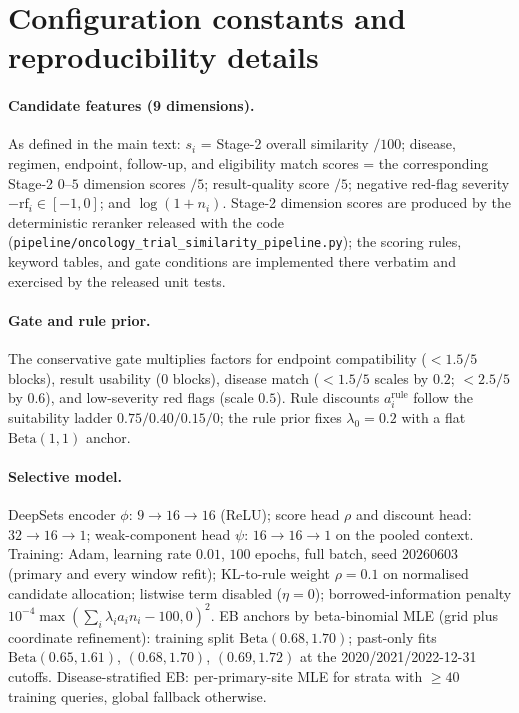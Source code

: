\documentclass[11pt]{article}
\begin{document}
\section{Configuration constants and reproducibility details}

\paragraph{Candidate features (9 dimensions).} As defined in the main text:
$s_i$ = Stage-2 overall similarity $/100$; disease, regimen, endpoint,
follow-up, and eligibility match scores = the corresponding Stage-2 $0$--$5$
dimension scores $/5$; result-quality score $/5$; negative red-flag severity
$-\mathrm{rf}_i \in [-1,0]$; and $\log(1+n_i)$. Stage-2 dimension scores are
produced by the deterministic reranker released with the code
(\texttt{pipeline/\allowbreak oncology\_trial\_similarity\_pipeline.py}); the scoring
rules, keyword tables, and gate conditions are implemented there verbatim and
exercised by the released unit tests.

\paragraph{Gate and rule prior.} The conservative gate multiplies factors for
endpoint compatibility ($<1.5/5$ blocks), result usability ($0$ blocks),
disease match ($<1.5/5$ scales by $0.2$; $<2.5/5$ by $0.6$), and low-severity
red flags (scale $0.5$). Rule discounts $a^{\mathrm{rule}}_i$ follow the
suitability ladder $0.75/0.40/0.15/0$; the rule prior fixes $\lambda_0=0.2$
with a flat $\mathrm{Beta}(1,1)$ anchor.

\paragraph{Selective model.} DeepSets encoder $\phi$: $9 \to 16 \to 16$
(ReLU); score head $\rho$ and discount head: $32 \to 16 \to 1$; weak-component
head $\psi$: $16 \to 16 \to 1$ on the pooled context. Training: Adam, learning
rate $0.01$, $100$ epochs, full batch, seed $20260603$ (primary and every
window refit); KL-to-rule weight $\rho = 0.1$ on normalised candidate
allocation; listwise term disabled ($\eta = 0$); borrowed-information penalty
$10^{-4}\max(\sum_i \lambda_i a_i n_i - 100, 0)^2$. EB anchors by
beta-binomial MLE (grid plus coordinate refinement): training split
$\mathrm{Beta}(0.68, 1.70)$; past-only fits $\mathrm{Beta}(0.65,1.61)$,
$(0.68,1.70)$, $(0.69,1.72)$ at the 2020/2021/2022-12-31 cutoffs.
Disease-stratified EB: per-primary-site MLE for strata with $\ge 40$ training
queries, global fallback otherwise.
\end{document}
